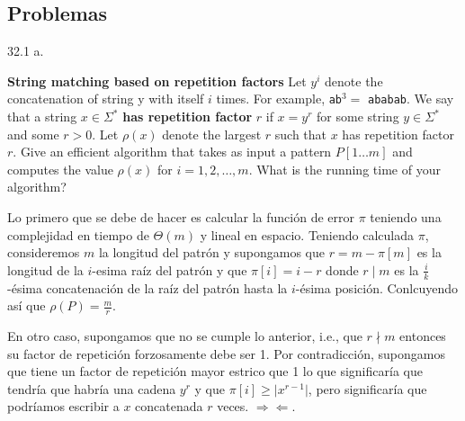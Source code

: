 \begin{algorithm}[H]
\end{algorithm}

\subsection{Problemas}

\begin{tcolorbox}
\hypertarget{repetition_factor}{32.1 a.}
\textbf{String matching based on repetition factors}
Let $y^i$ denote the concatenation of string y with itself $i$ times. For example,
\texttt{ab}$^3 =$ \texttt{ababab}. We say that a string $x \in \Sigma^*$
\textbf{has repetition factor} $r$ if $x = y^r$ for some string $y \in \Sigma^*$ and some $r > 0$.
Let $\rho(x)$ denote the largest $r$ such that $x$ has repetition factor $r$.
Give an efficient algorithm that takes as input a pattern $P[1 \ldots m]$ and computes the value
$\rho(x)$ for $i = 1,2,\ldots,m$. What is the running time of your algorithm?
\end{tcolorbox}

Lo primero que se debe de hacer es calcular la función de error $\pi$ teniendo una complejidad en
tiempo de $\Theta(m)$ y lineal en espacio. Teniendo calculada $\pi$, consideremos $m$ la longitud
del patrón y supongamos que $r = m - \pi[m]$ es la longitud de la $i$-esima raíz del patrón y que
$\pi[i] = i - r$ donde $r \mid m$ es la $\frac{i}{k}$-ésima concatenación de la raíz del patrón
hasta la $i$-ésima posición. Conlcuyendo así que $\rho(P) = \frac{m}{r}$.

En otro caso, supongamos que no se cumple lo anterior, i.e., que $r \nmid m$ entonces su factor de
repetición forzosamente debe ser 1. Por contradicción, supongamos que tiene un factor de repetición
mayor estrico que 1 lo que significaría que tendría que habría una cadena $y^r$ y que
$\pi[i] \geq \vert x^{r-1} \vert$, pero significaría que podríamos escribir a $x$ concatenada $r$
veces. $\Rightarrow\!\Leftarrow$.


